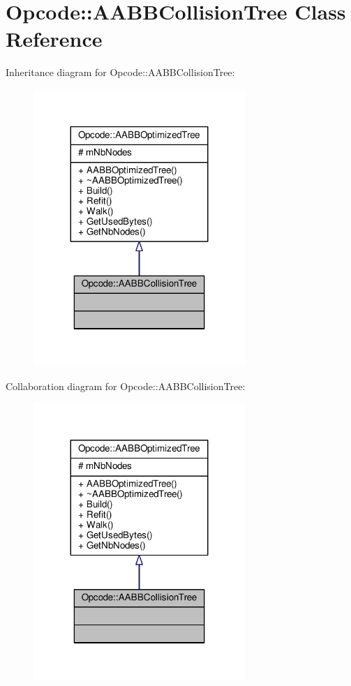 \hypertarget{classOpcode_1_1AABBCollisionTree}{}\section{Opcode\+:\+:A\+A\+B\+B\+Collision\+Tree Class Reference}
\label{classOpcode_1_1AABBCollisionTree}


Inheritance diagram for Opcode\+:\+:A\+A\+B\+B\+Collision\+Tree\+:
\nopagebreak
\begin{figure}[H]
\begin{center}
\leavevmode
\includegraphics[width=227pt]{de/df1/classOpcode_1_1AABBCollisionTree__inherit__graph}
\end{center}
\end{figure}


Collaboration diagram for Opcode\+:\+:A\+A\+B\+B\+Collision\+Tree\+:
\nopagebreak
\begin{figure}[H]
\begin{center}
\leavevmode
\includegraphics[width=227pt]{d5/d39/classOpcode_1_1AABBCollisionTree__coll__graph}
\end{center}
\end{figure}
